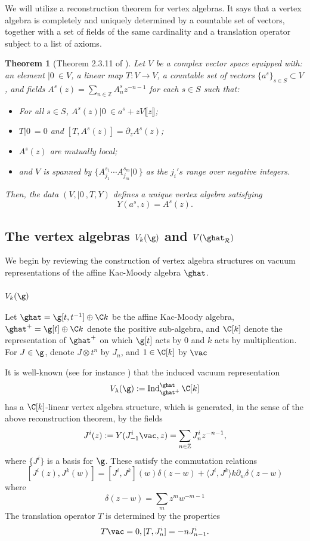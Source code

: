 \documentclass[12pt]{amsart}
\newtheorem{theorem}{Theorem}[section]
\theoremstyle{definition}
\theoremstyle{remark}
\newcommand{\on}{\operatorname}
\newcommand{\R}{\mathcal{R}}
\begin{document}
We will utilize a reconstruction theorem for vertex
algebras. It says that a vertex algebra is completely and uniquely determined by a
countable set of vectors, together with a set of fields of the same
cardinality and a translation operator subject to a list
of axioms. 

\begin{theorem}[Theorem 2.3.11 of \cite{FBZ}] Let $V$ be a complex vector space equipped with: an
  element $|0 \> \in V$, a linear map $T : V \to V$, a countable
    set of vectors $\{a^s\}_{s \in S} \subset V$, and fields $A^s(z) =
    \sum_{n \in \mathbb{Z}} A_n^sz^{-n-1}$ for each $s\in S$ such that:
\begin{itemize}
\item For all $s \in S$, $A^s(z) |0\> \in a^s + z V\llbracket
    z\rrbracket$;
\item $T |0\> = 0$ and $[T,A^s(z)] = \partial_z A^s(z)$;
\item $A^s(z)$ are mutually local;
\item and $V$ is spanned by $\{A_{j_1}^{s_1} \cdots A_{j_m}^{s_m}
  |0\>\}$ as the $j_i's$ range over negative integers. 
\end{itemize}
Then, the data $(V,|0\>, T,Y)$ defines a unique vertex algebra satisfying 
\[
Y(a^s,z) = A^s(z) .
\]
\end{theorem}

\subsection{The vertex algebras $V_{k}(\g)$ and $V(\ghat_{\R})$}

We begin by reviewing the construction of vertex algebra structures on vacuum representations of the affine Kac-Moody algebra $\ghat$.  

\subsubsection{$V_{k}(\g)$}
Let $\ghat = \g[t,t^{-1}] \oplus \C k$ be the affine Kac-Moody algebra, $\ghat^{+} = \g[t] \oplus \C k$ denote the positive sub-algebra, and $\C[k]$ denote the representation of $\ghat^{+}$ on which $\g[t]$ acts by $0$ and $k$ acts by multiplication. For $J \in \g$, denote $J \otimes t^n$ by $J_n$, and $1 \in \C[k]$ by $\vac$

It is well-known (see for instance \cite{FBZ}) that the induced vacuum representation
\[
V_{\lambda}(\g) := \on{Ind}^{\ghat}_{\ghat^+} \C[k]
\] 
has a $\C[k]$-linear vertex algebra structure, which is generated, in the sense of the above reconstruction theorem, by the fields
\[
J^i (z) := Y(J^{i}_{-1} \vac, z) = \sum_{n \in \mathbb{Z}} J^i_n z^{-n-1},
\]
where $\{ J^{i} \}$ is a basis for $\g$. These satisfy the commutation relations
\[
[J^i(z), J^{k}(w)] = [J^{i}, J^{k}](w) \delta(z-w) +  \langle J^{i}, J^{k} \rangle k \partial_w \delta(z-w)
\]
where 
\[
\delta(z-w) = \sum_{m} z^{m} w^{-m-1} 
\]
The translation operator $T$ is determined by the properties
\[
T \vac =0, [T, J^i_n] = -n J^{i}_{n-1}.
\]
\end{document}
